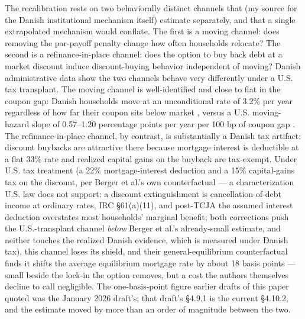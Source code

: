 \documentclass[12pt]{article}
\begin{document}
The recalibration rests on two behaviorally distinct channels that \citet{berger2026} (my source for the Danish institutional mechanism itself) estimate separately, and that a single extrapolated mechanism would conflate. The first is a moving channel: does removing the par-payoff penalty change how often households relocate? The second is a refinance-in-place channel: does the option to buy back debt at a market discount induce discount-buying behavior independent of moving? Danish administrative data show the two channels behave very differently under a U.S. tax transplant. The moving channel is well-identified and close to flat in the coupon gap: Danish households move at an unconditional rate of 3.2\% per year regardless of how far their coupon sits below market \citep[\S4.6, structural parameters in tab.~3]{berger2026}, versus a U.S. moving-hazard slope of 0.57--1.20 percentage points per year per 100 bp of coupon gap \citep{fonseca2024}. The refinance-in-place channel, by contrast, is substantially a Danish tax artifact: discount buybacks are attractive there because mortgage interest is deductible at a flat 33\% rate and realized capital gains on the buyback are tax-exempt. Under U.S. tax treatment (a 22\% mortgage-interest deduction and a 15\% capital-gains tax on the discount, per Berger et al.'s own counterfactual --- a characterization U.S. law does not support: a discount extinguishment is cancellation-of-debt income at ordinary rates, IRC \S 61(a)(11), and post-TCJA the assumed interest deduction overstates most households' marginal benefit; both corrections push the U.S.-transplant channel \emph{below} Berger et al.'s already-small estimate, and neither touches the realized Danish evidence, which is measured under Danish tax), this channel loses its shield, and their general-equilibrium counterfactual \citep[\S4.10.2]{berger2026} finds it shifts the average equilibrium mortgage rate by about 18 basis points --- small beside the lock-in the option removes, but a cost the authors themselves decline to call negligible. The one-basis-point figure earlier drafts of this paper quoted was the January 2026 draft's; that draft's \S4.9.1 is the current \S4.10.2, and the estimate moved by more than an order of magnitude between the two.
\end{document}
